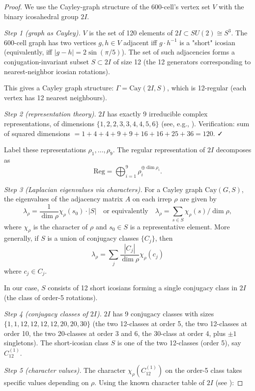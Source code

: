 \documentclass[11pt, a4paper]{amsart}
\theoremstyle{definition}
\begin{document}
\begin{proof}
We use the Cayley-graph structure of the 600-cell's vertex set $V$
with the binary icosahedral group $2I$.

\emph{Step 1 (graph as Cayley).} $V$ is the set of 120 elements of
$2I \subset SU(2) \cong S^3$. The 600-cell graph has two vertices
$g, h \in V$ adjacent iff $g \cdot h^{-1}$ is a "short" icosian
(equivalently, iff $|g - h| = 2 \sin(\pi/5)$). The set of such
adjacencies forms a conjugation-invariant subset $S \subset 2I$ of
size 12 (the 12 generators corresponding to nearest-neighbor
icosian rotations).

This gives a Cayley graph structure:
$\Gamma = \mathrm{Cay}(2I, S)$, which is 12-regular (each vertex
has 12 nearest neighbours).

\emph{Step 2 (representation theory).}
$2I$ has exactly 9 irreducible complex representations, of dimensions
$\{1, 2, 2, 3, 3, 4, 4, 5, 6\}$ (see, e.g., \cite[Table 5.1]{conwayQ}).
Verification: sum of squared dimensions $= 1 + 4 + 4 + 9 + 9 + 16 + 16 + 25 + 36 = 120$. ✓

Label these representations $\rho_1, \dots, \rho_9$. The regular
representation of $2I$ decomposes as
\[
\mathrm{Reg} = \bigoplus_{i=1}^9 \rho_i^{\oplus \dim \rho_i}.
\]

\emph{Step 3 (Laplacian eigenvalues via characters).}
For a Cayley graph $\mathrm{Cay}(G, S)$, the eigenvalues of the
adjacency matrix $A$ on each irrep $\rho$ are given by
\[
\lambda_\rho = \frac{1}{\dim \rho} \chi_\rho(s_0) \cdot |S|
\quad \text{or equivalently} \quad
\lambda_\rho = \sum_{s \in S} \chi_\rho(s) / \dim \rho,
\]
where $\chi_\rho$ is the character of $\rho$ and $s_0 \in S$ is a
representative element. More generally, if $S$ is a union of
conjugacy classes $\{C_j\}$, then
\[
\lambda_\rho = \sum_j \frac{|C_j|}{\dim \rho} \chi_\rho(c_j)
\]
where $c_j \in C_j$.

In our case, $S$ consists of 12 short icosians forming a single
conjugacy class in $2I$ (the class of order-5 rotations).

\emph{Step 4 (conjugacy classes of $2I$).}
$2I$ has 9 conjugacy classes with sizes $\{1, 1, 12, 12, 12, 12, 20, 20, 30\}$
(the two 12-classes at order 5, the two 12-classes at order 10, the two
20-classes at order 3 and 6, the 30-class at order 4, plus $\pm 1$
singletons). The short-icosian class $S$ is one of the two 12-classes
(order 5), say $C_{12}^{(1)}$.

\emph{Step 5 (character values).}
The character $\chi_\rho(C_{12}^{(1)})$ on the order-5 class takes
specific values depending on $\rho$. Using the known character table
of $2I$ (see \cite[Table 5.1]{conwayQ}):


\end{proof}
\end{document}
